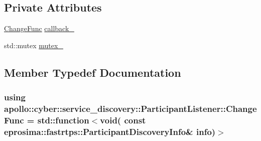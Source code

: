\subsection*{Private Attributes}
\begin{DoxyCompactItemize}
\item 
\hyperlink{classapollo_1_1cyber_1_1service__discovery_1_1ParticipantListener_aeb34c3abc88e4f17c1954756e9f2b8db}{Change\-Func} \hyperlink{classapollo_1_1cyber_1_1service__discovery_1_1ParticipantListener_ac402f1152bd826e26d4e2153e87cb5d9}{callback\-\_\-}
\item 
std\-::mutex \hyperlink{classapollo_1_1cyber_1_1service__discovery_1_1ParticipantListener_ac9df2d48a1b024f63f85f68cb2965088}{mutex\-\_\-}
\end{DoxyCompactItemize}


\subsection{Member Typedef Documentation}
\hypertarget{classapollo_1_1cyber_1_1service__discovery_1_1ParticipantListener_aeb34c3abc88e4f17c1954756e9f2b8db}{
\subsubsection[{Change\-Func}]{\setlength{\rightskip}{0pt plus 5cm}using {\bf apollo\-::cyber\-::service\-\_\-discovery\-::\-Participant\-Listener\-::\-Change\-Func} =  std\-::function$<$void( const eprosima\-::fastrtps\-::\-Participant\-Discovery\-Info\& info)$>$}}\label{classapollo_1_1cyber_1_1service__discovery_1_1ParticipantListener_aeb34c3abc88e4f17c1954756e9f2b8db}


